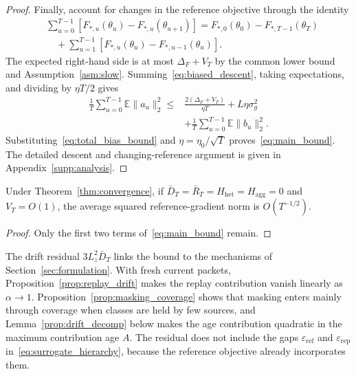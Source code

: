 \begin{proof}
Finally, account for changes in the reference objective through the identity
\begin{equation}
\begin{split}
 &\sum_{u=0}^{T-1}
 [F_{*,u}(\theta_u)-F_{*,u}(\theta_{u+1})]=F_{*,0}(\theta_0)-F_{*,T-1}(\theta_T)\\
 &\quad+\sum_{u=1}^{T-1}
 [F_{*,u}(\theta_u)-F_{*,u-1}(\theta_u)].
\end{split}
\label{eq:changing_reference_telescope}
\end{equation}
The expected right-hand side is at most $\Delta_F+V_T$ by the common lower bound and Assumption~\ref{asm:slow}. Summing~\eqref{eq:biased_descent}, taking expectations, and dividing by $\eta T/2$ gives
\begin{equation}
\begin{split}
 \frac1T\sum_{u=0}^{T-1}\mathbb E\|a_u\|_2^2
 \le{}&\frac{2(\Delta_F+V_T)}{\eta T}
 +L\eta\sigma_g^2\\
 &+\frac1T\sum_{u=0}^{T-1}\mathbb E\|b_u\|_2^2 .
\end{split}
\label{eq:average_descent}
\end{equation}
Substituting~\eqref{eq:total_bias_bound} and $\eta=\eta_0/\sqrt T$ proves~\eqref{eq:main_bound}.
\fi
The detailed descent and changing-reference argument is given in Appendix~\ref{supp:analysis}.
\end{proof}

\begin{corollary}
\label{cor:small_perturb}
Under Theorem~\ref{thm:convergence}, if
$\bar D_T=\bar R_T=H_{\mathrm{het}}=H_{\mathrm{agg}}=0$
and $V_T=O(1)$, the average squared reference-gradient norm is $O(T^{-1/2})$.
\end{corollary}
\begin{proof}
Only the first two terms of~\eqref{eq:main_bound} remain.
\end{proof}

\begin{remark}
\label{rem:drift_residual}
The drift residual $3L_z^2\bar D_T$ links the bound to the mechanisms of Section~\ref{sec:formulation}. With fresh current packets, Proposition~\ref{prop:replay_drift} makes the replay contribution vanish linearly as $\alpha\to1$. Proposition~\ref{prop:masking_coverage} shows that masking enters mainly through coverage when classes are held by few sources, and Lemma~\ref{prop:drift_decomp} below makes the age contribution quadratic in the maximum contribution age $A$. The residual does not include the gaps $\varepsilon_{\mathrm{ref}}$ and $\varepsilon_{\mathrm{rep}}$ in~\eqref{eq:surrogate_hierarchy}, because the reference objective already incorporates them.
\end{remark}

